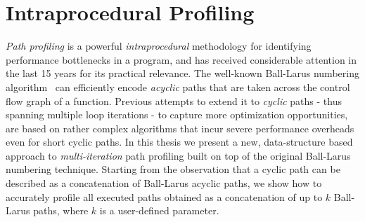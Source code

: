 \section{Intraprocedural Profiling}

{\em Path profiling} is a powerful {\em intraprocedural} methodology for identifying performance bottlenecks in a program, and has received considerable attention in the last 15 years for its practical relevance. The well-known Ball-Larus numbering algorithm~\cite{Ball96} can efficiently encode {\em acyclic} paths that are taken across the control flow graph of a function. Previous attempts to extend it to {\em cyclic} paths - thus spanning multiple loop iterations - to capture more optimization opportunities, are based on rather complex algorithms that incur severe performance overheads even for short cyclic paths. In this thesis we present a new, data-structure based approach to {\em multi-iteration} path profiling built on top of the original Ball-Larus numbering technique. Starting from the observation that a cyclic path can be described as a concatenation of Ball-Larus acyclic paths, we show how to accurately profile all executed paths obtained as a concatenation of up to $k$ Ball-Larus paths, where $k$ is a user-defined parameter.



